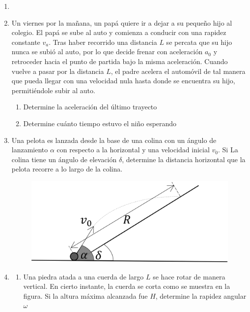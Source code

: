 \documentclass[letterpaper,11pt]{article}
\begin{document}
\vspace{-1cm}
\begin{enumerate}\setlength{\itemsep}{0.4cm}


\item[]


\item Un viernes por la mañana, un papá quiere ir a dejar a su pequeño hijo al colegio. El papá se sube al auto y comienza a conducir con una rapidez constante $v_a$. Tras haber recorrido una distancia $L$ se percata que su hijo nunca se subió al auto, por lo que decide frenar con aceleración $a_{0}$ y retroceder hacia el punto de partida bajo la misma aceleración. Cuando vuelve a pasar por la distancia $L$, el padre acelera el automóvil de tal manera que pueda llegar con una velocidad nula hasta donde se encuentra su hijo, permitiéndole subir al auto.

\begin{enumerate}
    \item Determine la aceleración del último trayecto
    \item Determine cuánto tiempo estuvo el niño esperando
\end{enumerate}

\item Una pelota es lanzada desde la base de una colina con un ángulo de lanzamiento $\alpha$ con respecto a la horizontal y una velocidad inicial $v_0$. Si La colina tiene un ángulo de elevación $\delta$, determine la distancia horizontal que la pelota recorre a lo largo de la colina.
    
\begin{figure}[H]
    \centering
    \includegraphics[width=0.4\linewidth]{2023-1/img/TD 2/plano.png}
\end{figure}


\item 
\begin{enumerate}
    \item Una piedra atada a una cuerda de largo $L$ se hace rotar de manera vertical. En cierto instante, la cuerda se corta como se muestra en la figura. Si la altura máxima alcanzada fue $H$, determine la rapidez angular $\omega$


\end{enumerate}
\end{enumerate}
\end{document}
